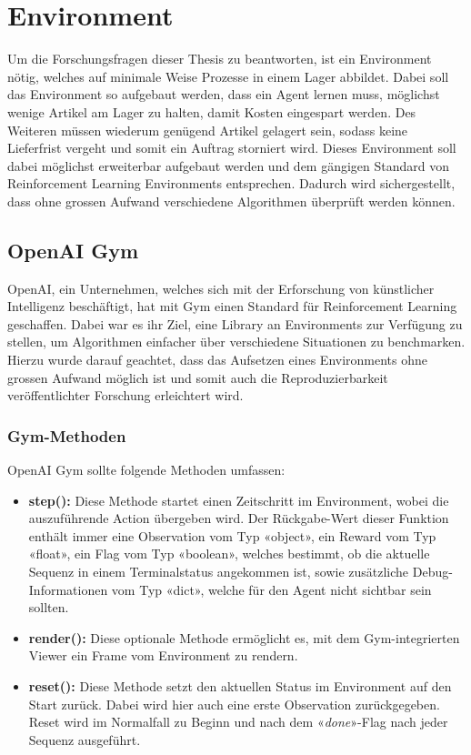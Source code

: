 \chapter{Environment}
Um die Forschungsfragen dieser Thesis zu beantworten, ist ein Environment nötig, welches auf minimale Weise Prozesse in einem Lager abbildet. Dabei soll das Environment so aufgebaut werden, dass ein Agent lernen muss, möglichst wenige Artikel am Lager zu halten, damit Kosten eingespart werden. Des Weiteren müssen wiederum genügend Artikel gelagert sein, sodass keine Lieferfrist vergeht und somit ein Auftrag storniert wird. Dieses Environment soll dabei möglichst erweiterbar aufgebaut werden und dem gängigen Standard von Reinforcement Learning Environments entsprechen. Dadurch wird sichergestellt, dass ohne grossen Aufwand verschiedene Algorithmen überprüft werden können.
\section{OpenAI Gym}
OpenAI, ein Unternehmen, welches sich mit der Erforschung von künstlicher Intelligenz beschäftigt, hat mit Gym \cite{gym} einen Standard für Reinforcement Learning geschaffen. Dabei war es ihr Ziel, eine Library an Environments zur Verfügung zu stellen, um Algorithmen einfacher über verschiedene Situationen zu benchmarken. Hierzu wurde darauf geachtet, dass das Aufsetzen eines Environments ohne grossen Aufwand möglich ist und somit auch die Reproduzierbarkeit veröffentlichter Forschung erleichtert wird.
\subsection{Gym-Methoden}
OpenAI Gym sollte folgende Methoden umfassen:
\begin{itemize}
    \item \textbf{step():} Diese Methode startet einen Zeitschritt im Environment, wobei die auszuführende Action übergeben wird. Der Rückgabe-Wert dieser Funktion enthält immer eine Observation vom Typ «object», ein Reward vom Typ «float», ein Flag vom Typ «boolean», welches bestimmt, ob die aktuelle Sequenz in einem Terminalstatus angekommen ist, sowie zusätzliche Debug-Informationen vom Typ «dict», welche für den Agent nicht sichtbar sein sollten. 
\item \textbf{render():} Diese optionale Methode ermöglicht es, mit dem Gym-integrierten Viewer ein Frame vom Environment zu rendern.
\item \textbf{reset():} Diese Methode setzt den aktuellen Status im Environment auf den Start zurück. Dabei wird hier auch eine erste Observation zurückgegeben. Reset wird im Normalfall zu Beginn und nach dem «\emph{done}»-Flag nach jeder Sequenz ausgeführt.

\end{itemize}








